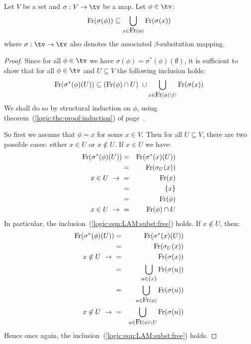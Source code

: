 \begin{prop}\label{logic:prop:LAM:subst:free}
Let $V$ be a set and $\sigma:V\to\tv$ be a map. Let $\phi\in\tv$:
    \[
    \mbox{\rm Fr}(\sigma(\phi))\subseteq\bigcup_{x\in\mbox{\rm Fr}(\phi)} \mbox{\rm Fr}(\sigma(x))
    \]
where $\sigma:\tv\to\tv$ also denotes the associated $\beta$-subsitution mapping.
\end{prop}
\begin{proof}
Since for all $\phi\in\tv$ we have $\sigma(\phi)=\sigma^{*}(\phi)(\emptyset)$, 
it is sufficient to show that for all $\phi\in\tv$ and $U\subseteq V$ the following
inclusion holds:
    \begin{equation}\label{logic:eqn:LAM:subst:free}
        \mbox{\rm Fr}(\sigma^{*}(\phi)(U)) \subseteq (\mbox{\rm Fr}(\phi)\cap U)\ \cup
        \bigcup_{x\in\mbox{\rm Fr}(\phi)\setminus U} \mbox{\rm Fr}(\sigma(x))
    \end{equation}
We shall do so by structural induction on $\phi$, using
theorem~(\ref{logic:the:proof:induction}) of 
page~\pageref{logic:the:proof:induction}.

So first we assume that $\phi=x$ for some $x\in V$. Then for all $U\subseteq V$, there are
two possible cases: either $x\in U$ or $x\not\in U$. If $x\in U$ we have:
    \begin{eqnarray*}
        \mbox{\rm Fr}(\sigma^{*}(\phi)(U))
        &=&\mbox{\rm Fr}(\sigma^{*}(x)(U))\\
        &=&\mbox{\rm Fr}(\sigma_{U}(x))\\
        \mbox{$x\in U\ \rightarrow\ $}&=&\mbox{\rm Fr}(x)\\
         &=&\{x\}\\
         &=&\mbox{\rm Fr}(\phi)\\
        \mbox{$x\in U\ \rightarrow\ $}&=&\mbox{\rm Fr}(\phi)\cap U
    \end{eqnarray*}
In particular, the inclusion~(\ref{logic:eqn:LAM:subst:free}) holds. If $x\not\in U$, then:
    \begin{eqnarray*}
        \free(\sigma^{*}(\phi)(U))
        &=&\free(\sigma^{*}(x)(U))\\
        &=&\free(\sigma_{U}(x))\\
        \mbox{$x\not\in U\ \rightarrow\ $}&=&\free(\sigma(x))\\
        &=&\bigcup_{u\in\{x\}} \free(\sigma(u))\\
        &=&\bigcup_{u\in\free(\phi)} \free(\sigma(u))\\
        \mbox{$x\not\in U\ \rightarrow\ $}&=&\bigcup_{u\in\free(\phi)\setminus U} 
            \free(\sigma(u))
    \end{eqnarray*}
Hence once again, the inclusion~(\ref{logic:eqn:LAM:subst:free}) holds.
 

\end{proof}
